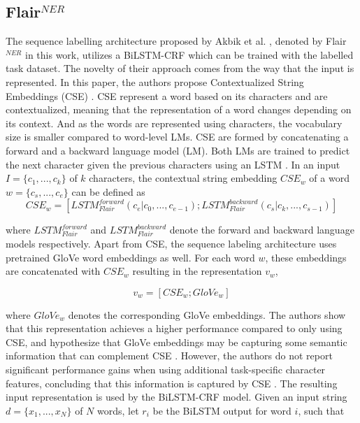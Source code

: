 \documentclass{report}
\theoremstyle{definition}
\theoremstyle{remark}
\begin{document}
\subsection{Flair$^{NER}$}
The sequence labelling architecture proposed by Akbik et al. \cite{flairpaper}, denoted by Flair$^{NER}$ in this work, utilizes a BiLSTM-CRF \cite{BiLSTMCRF} which can be trained with the labelled task dataset. The novelty of their approach comes from the way that the input is represented. In this paper, the authors propose Contextualized String Embeddings (CSE) \cite{flairpaper}. CSE represent a word based on its characters and are contextualized, meaning that the representation of a word changes depending on its context. And as the words are represented using characters, the vocabulary size is smaller compared to word-level LMs. CSE are formed by concatenating a forward and a backward language model (LM). Both LMs are trained to predict the next character given the previous characters using an LSTM \cite{lstm}. In an input $I=\{c_1,...,c_k\}$ of $k$ characters, the contextual string embedding $CSE_w$ of a word $w=\{c_s,...,c_e\}$ can be defined as
\begin{equation}
    CSE_w = [ LSTM^{forward}_{Flair}(c_e | c_0,...,c_{e-1}); LSTM^{backward}_{Flair}(c_s | c_k,...,c_{s-1}) ]
\end{equation}

where $LSTM^{forward}_{Flair}$ and $LSTM^{backward}_{Flair}$ denote the forward and backward language models respectively. Apart from CSE, the sequence labeling architecture uses pretrained GloVe \cite{glove} word embeddings as well. For each word $w$, these embeddings are concatenated with $CSE_w$ resulting in the representation $v_w$,

\begin{equation}
    v_w = [CSE_w;GloVe_w]
\end{equation}

where $GloVe_w$ denotes the corresponding GloVe embeddings. The authors show that this representation achieves a higher performance compared to only using CSE, and hypothesize that GloVe embeddings may be capturing some semantic information that can complement CSE \cite{flairpaper}. However, the authors do not report significant performance gains when using additional task-specific character features, concluding that this information is captured by CSE \cite{flairpaper}. The resulting input representation is used by the BiLSTM-CRF model. Given an input string $d=\{x_1,...,x_N\}$ of $N$ words, let $r_i$ be the BiLSTM output for word $i$, such that
\end{document}
